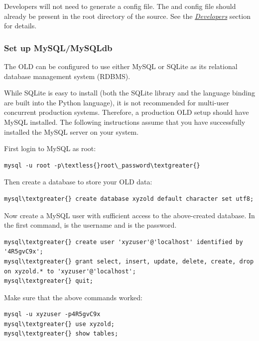 \documentclass[letterpaper,10pt,english]{sphinxmanual}
\begin{document}
Developers will not need to generate a config file.  The  and
 config file should already be present in the root directory
of the source.  See the {\hyperref[installation:developers]{\emph{Developers}}} section for details.


\subsubsection{Set up MySQL/MySQLdb}
\label{installation:set-up-mysql-mysqldb}\label{installation:mysql-config}
The OLD can be configured to use either MySQL or SQLite as its relational
database management system (RDBMS).

While SQLite is easy to install (both the SQLite library and the 
language binding are built into the Python language), it is not recommended for
multi-user concurrent production systems.  Therefore, a production OLD setup
should have MySQL installed.  The following instructions assume that you have
successfully installed the MySQL server on your system.

First login to MySQL as root:

\begin{Verbatim}[commandchars=\\\{\}]
mysql -u root -p\textless{}root\_password\textgreater{}
\end{Verbatim}

Then create a database to store your OLD data:

\begin{Verbatim}[commandchars=\\\{\}]
mysql\textgreater{} create database xyzold default character set utf8;
\end{Verbatim}

Now create a MySQL user with sufficient access to the above-created database.
In the first command,  is the username and  is the
password.

\begin{Verbatim}[commandchars=\\\{\}]
mysql\textgreater{} create user 'xyzuser'@'localhost' identified by '4R5gvC9x';
mysql\textgreater{} grant select, insert, update, delete, create, drop on xyzold.* to 'xyzuser'@'localhost';
mysql\textgreater{} quit;
\end{Verbatim}

Make sure that the above commands worked:

\begin{Verbatim}[commandchars=\\\{\}]
mysql -u xyzuser -p4R5gvC9x
mysql\textgreater{} use xyzold;
mysql\textgreater{} show tables;
\end{Verbatim}
\end{document}
